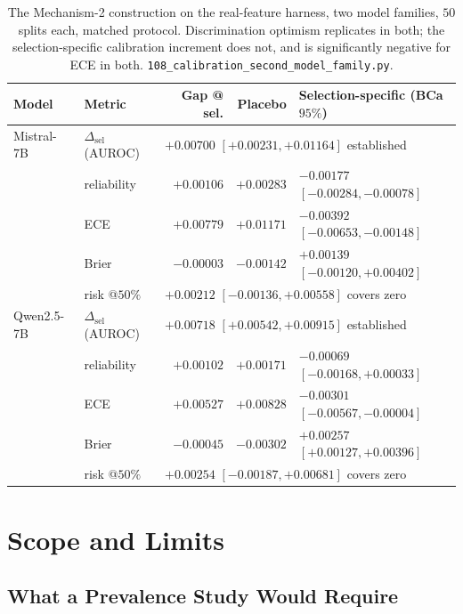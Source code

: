 \documentclass{article}
\begin{document}
\begin{table}[h]
\centering
\small
{\setlength{\tabcolsep}{4pt}
\begin{tabular}{@{}llrrl@{}}
\toprule
Model & Metric & Gap @ sel. & Placebo & Selection-specific (BCa $95\%$) \\
\midrule
Mistral-7B  & $\Delta_\text{sel}$ (AUROC) & \multicolumn{3}{l}{$+0.00700$ $[+0.00231,+0.01164]$ \quad established} \\
            & reliability & $+0.00106$ & $+0.00283$ & $-0.00177$ $[-0.00284,-0.00078]$ \\
            & ECE         & $+0.00779$ & $+0.01171$ & $-0.00392$ $[-0.00653,-0.00148]$ \\
            & Brier       & $-0.00003$ & $-0.00142$ & $+0.00139$ $[-0.00120,+0.00402]$ \\
            & risk @$50\%$ & \multicolumn{3}{l}{$+0.00212$ $[-0.00136,+0.00558]$ \quad covers zero} \\
\midrule
Qwen2.5-7B  & $\Delta_\text{sel}$ (AUROC) & \multicolumn{3}{l}{$+0.00718$ $[+0.00542,+0.00915]$ \quad established} \\
            & reliability & $+0.00102$ & $+0.00171$ & $-0.00069$ $[-0.00168,+0.00033]$ \\
            & ECE         & $+0.00527$ & $+0.00828$ & $-0.00301$ $[-0.00567,-0.00004]$ \\
            & Brier       & $-0.00045$ & $-0.00302$ & $+0.00257$ $[+0.00127,+0.00396]$ \\
            & risk @$50\%$ & \multicolumn{3}{l}{$+0.00254$ $[-0.00187,+0.00681]$ \quad covers zero} \\
\bottomrule
\end{tabular}}
\caption{The Mechanism-2 construction on the real-feature harness, two model
families, $50$ splits each, matched protocol. Discrimination optimism
replicates in both; the selection-specific calibration increment does not, and
is significantly negative for ECE in both.
\texttt{108\_calibration\_second\_model\_family.py}.}
\label{tab:secondfamily}
\end{table}

\section{Scope and Limits}

\subsection{What a Prevalence Study Would Require}
\label{app:prevalence}
\end{document}
